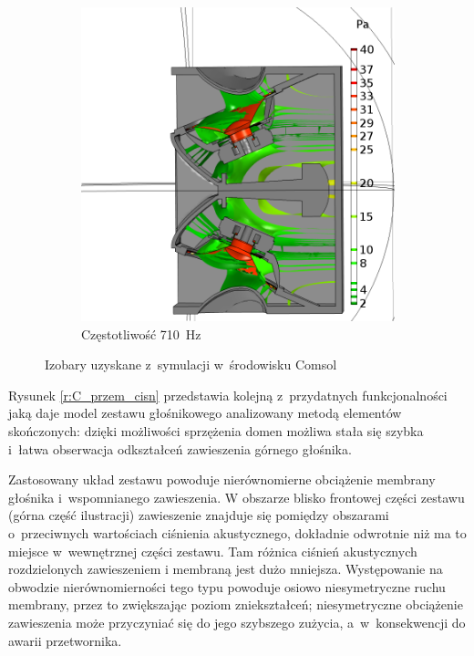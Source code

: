 \documentclass[12pt]{oska}
\begin{document}
\begin{figure}[!ht]
\begin{subfigure}[b]{.49\textwidth}
			\includegraphics[width=\textwidth]{absp_710Hz.png}
			\caption{Częstotliwość \SI{710}{\hertz}}
			\label{r:C_710iz}
		\end{subfigure}
		
		\caption{Izobary uzyskane z~symulacji w~środowisku Comsol}
		\label{r:C_balony}
	\end{figure}
	
	Rysunek \ref{r:C_przem_cisn} przedstawia kolejną z~przydatnych funkcjonalności jaką daje model zestawu głośnikowego analizowany metodą elementów skończonych: dzięki możliwości sprzężenia domen możliwa stała się szybka i~łatwa obserwacja odkształceń zawieszenia górnego głośnika. 
	
	Zastosowany układ zestawu powoduje nierównomierne obciążenie membrany głośnika i~wspomnianego zawieszenia. W obszarze blisko frontowej części zestawu (górna część ilustracji) zawieszenie znajduje się pomiędzy obszarami o~przeciwnych wartościach ciśnienia akustycznego, dokładnie odwrotnie niż ma to miejsce w~wewnętrznej części zestawu. Tam różnica ciśnień akustycznych rozdzielonych zawieszeniem i membraną jest dużo mniejsza. Występowanie na obwodzie nierównomierności tego typu powoduje osiowo niesymetryczne ruchu membrany, przez to zwiększając poziom zniekształceń; niesymetryczne obciążenie zawieszenia może przyczyniać się do jego szybszego zużycia, a~w~konsekwencji do awarii przetwornika.  
	
\end{document}

